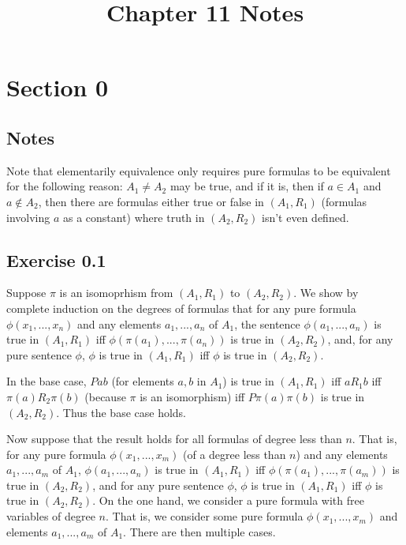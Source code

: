 \documentclass{article}
\title{Chapter 11 Notes}
\theoremstyle{definition}
\begin{document}
\date{}
\maketitle

\section*{Section 0}

\subsection*{Notes}
Note that elementarily equivalence only requires pure formulas 
to be equivalent for the following reason: $A_1\ne A_2$ may be true, and if it is, 
then if $a\in A_1$ and $a\notin A_2$, then there are formulas either true or false in 
$(A_1,R_1)$ (formulas involving $a$ as a constant) where truth in $(A_2,R_2)$ isn't 
even defined.

\subsection*{Exercise 0.1}
Suppose $\pi$ is an isomoprhism from $(A_1,R_1)$ to $(A_2,R_2)$. 
We show by complete induction on the degrees of 
formulas that for any pure formula $\phi(x_1,...,x_n)$ 
and any elements $a_1,...,a_n$ of 
$A_1$, the sentence $\phi(a_1,...,a_n)$ 
is true in $(A_1,R_1)$ iff 
$\phi(\pi(a_1),...,\pi(a_n))$ is true in 
$(A_2,R_2)$, and, for any pure sentence $\phi$, 
$\phi$ is true in $(A_1,R_1)$ iff $\phi$ is true 
in $(A_2,R_2)$. 

In the base case, $Pab$ (for elements $a,b$ in $A_1$) is true in $(A_1,R_1)$ iff 
$aR_1b$ iff $\pi(a)R_2\pi(b)$ (because $\pi$ is an isomorphism) iff $P\pi(a)\pi(b)$ is true in 
$(A_2,R_2)$. Thus the base case holds.

Now suppose that the result holds for all formulas of degree less than $n$. That is, 
for any pure formula $\phi(x_1,...,x_m)$ (of a degree less than $n$) and any elements 
$a_1,...,a_m$ of $A_1$, $\phi(a_1,...,a_n)$ is true in $(A_1,R_1)$ iff
$\phi(\pi(a_1),...,\pi(a_m))$ is true in $(A_2,R_2)$, and for any pure sentence $\phi$, 
$\phi$ is true in $(A_1,R_1)$ iff $\phi$ is true in $(A_2,R_2)$. On the one hand, we consider a 
pure formula with free variables of degree $n$. That is, we consider some pure formula 
$\phi(x_1,...,x_m)$ and elements $a_1,...,a_m$ of $A_1$. There are then multiple cases.
\end{document}
